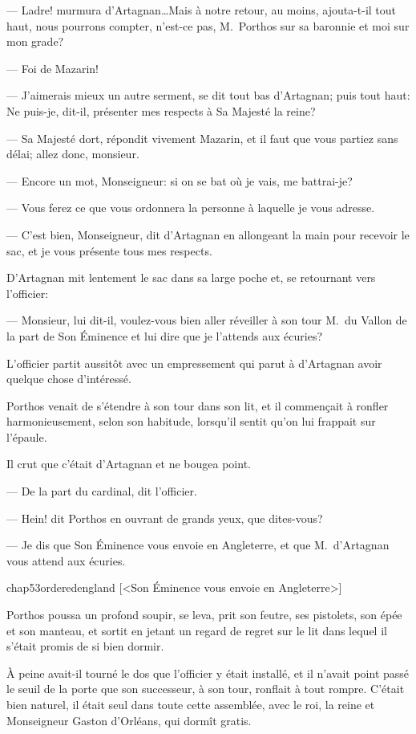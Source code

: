— Ladre! murmura d'Artagnan\dots Mais à notre retour, au moins, ajouta-t-il tout haut, nous pourrons compter, n'est-ce pas, M.~Porthos sur sa baronnie et moi sur mon grade?

— Foi de Mazarin!

— J'aimerais mieux un autre serment, se dit tout bas d'Artagnan; puis tout haut: Ne puis-je, dit-il, présenter mes respects à Sa Majesté la reine?

— Sa Majesté dort, répondit vivement Mazarin, et il faut que vous partiez sans délai; allez donc, monsieur.

— Encore un mot, Monseigneur: si on se bat où je vais, me battrai-je?

— Vous ferez ce que vous ordonnera la personne à laquelle je vous adresse.

— C'est bien, Monseigneur, dit d'Artagnan en allongeant la main pour recevoir le sac, et je vous présente tous mes respects.

D'Artagnan mit lentement le sac dans sa large poche et, se retournant vers l'officier:

— Monsieur, lui dit-il, voulez-vous bien aller réveiller à son tour M.~du Vallon de la part de Son Éminence et lui dire que je l'attends aux écuries?

L'officier partit aussitôt avec un empressement qui parut à d'Artagnan avoir quelque chose d'intéressé.

Porthos venait de s'étendre à son tour dans son lit, et il commençait à ronfler harmonieusement, selon son habitude, lorsqu'il sentit qu'on lui frappait sur l'épaule.

Il crut que c'était d'Artagnan et ne bougea point.

— De la part du cardinal, dit l'officier.

— Hein! dit Porthos en ouvrant de grands yeux, que dites-vous?

— Je dis que Son Éminence vous envoie en Angleterre, et que M.~d'Artagnan vous attend aux écuries.

\begin{bwbigpic}
	[\basicscale] 
	{chap53orderedengland}
	[<Son Éminence vous envoie en Angleterre>]
\end{bwbigpic}

Porthos poussa un profond soupir, se leva, prit son feutre, ses pistolets, son épée et son manteau, et sortit en jetant un regard de regret sur le lit dans lequel il s'était promis de si bien dormir.

À peine avait-il tourné le dos que l'officier y était installé, et il n'avait point passé le seuil de la porte que son successeur, à son tour, ronflait à tout rompre. C'était bien naturel, il était seul dans toute cette assemblée, avec le roi, la reine et Monseigneur Gaston d'Orléans, qui dormît gratis.